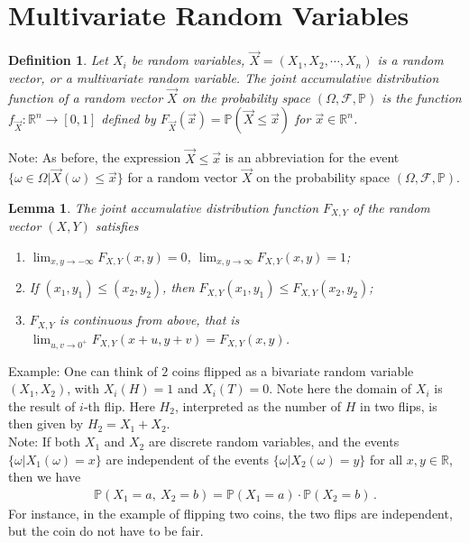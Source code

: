 \documentclass[11pt, onesided]{book}
\theoremstyle{break}
\theoremstyle{break}
\newtheorem{lem}{Lemma}[thm]
\newtheorem{defn}{Definition}[thm]
\newcommand{\R}{\mathbb{R}}
\newcommand{\note}{\color{red}Note: \color{black}}
\newcommand{\example}{\color{green}Example: \color{black}}
\begin{document}
\section[Multivariate Random Variables]{\color{red} Multivariate Random Variables\color{red}}
\begin{defn}
Let $X_i$ be random variables, $\vec{X} = (X_1,X_2,\cdots, X_n)$ is a random vector, or a multivariate random variable. The joint accumulative distribution function of a random vector $\vec{X}$ on the probability space $(\Omega , \mathcal{F}, \mathbb{P})$ is the function $f_{\vec{X}}:\R^n \to [0,1]$ defined by $F_{\vec{X}}(\vec{x}) = \mathbb{P}(\vec{X} \leq \vec{x})$ for $\vec{x} \in \R^n$. 
\end{defn}
\note As before, the expression $\vec{X}\leq \vec{x}$ is an abbreviation for the event $\{\omega \in \Omega | \vec{X}(\omega) \leq \vec{x}\}$ for a random vector $\vec{X}$ on the probability space $(\Omega, \mathcal{F}, \mathbb{P})$.\\

\begin{lem}
The joint accumulative distribution function $F_{X,Y}$ of the random vector $(X,Y)$ satisfies 
\begin{enumerate}[topsep=3pt,itemsep=-1ex,partopsep=1ex,parsep=1ex]
\item $\lim_{x,y \to -\infty}F_{X,Y}(x,y) =0$, $\lim_{x,y\to \infty}F_{X,Y}(x,y) = 1$; 
\item If $(x_1,y_1) \leq (x_2,y_2)$, then $F_{X,Y}(x_1,y_1) \leq F_{X,Y}(x_2,y_2)$;
\item $F_{X,Y}$ is continuous from above, that is $\lim_{u,v \to 0^+} F_{X,Y}(x+u , y+v) = F_{X,Y}(x,y)$.
\end{enumerate}
\end{lem}

\example One can think of $2$ coins flipped as a bivariate random variable $(X_1,X_2)$, with $X_i(H) = 1$ and $X_i(T) = 0$. Note here the domain of $X_i$ is the result of $i$-th flip. Here $H_2$, interpreted as the number of $H$ in two flips, is then given by $H_2 = X_1 + X_2$. \\

\note If both $X_1$ and $X_2$ are discrete random variables, and the events $\{\omega |X_1(\omega) = x\}$ are independent of the events $\{\omega |X_2(\omega)= y\}$ for all $x,y \in \R$, then we have
\begin{align*}
\mathbb{P}(X_1 = a,\ X_2 =b) = \mathbb{P}(X_1 = a) \cdot \mathbb{P}(X_2 =b)\,.
\end{align*}
For instance, in the example of flipping two coins, the two flips are independent, but the coin do not have to be fair. 
\end{document}
